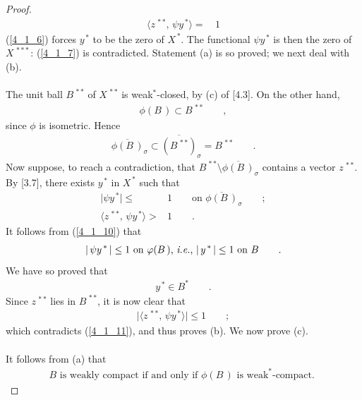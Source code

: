\begin{proof}
\begin{align}
\label{4_1_7} \langle z^{\,\ast\ast},\, \psi y^{\,\ast} \rangle=&\,1
\end{align}
% 
(\ref{4_1_6}) forces $y^{\,\ast}$ to be the zero of $X^{\,\ast}$. The functional $\psi y^{\,\ast}$ is then the zero of
$X^{\,\ast\ast\ast}$: (\ref{4_1_7}) is contradicted. Statement (a) is so proved; we next deal with (b).\\
\\
The unit ball $B^{\,\ast\ast}$ of $X^{\,\ast\ast}$ is weak$^\ast$-closed, by (c) of [4.3]. On the other hand,
% 
\begin{align}
\phi(B\,)\subset  B^{\,\ast\ast}\qquad ,
\end{align}
% 
since $\phi$ is isometric. Hence
% 
\begin{align}
\overline{\phi(B\,)}_\sigma\subset \overline{ (B^{\,\ast\ast})}_\sigma=  B^{\,\ast\ast}\qquad .
\end{align}
% 
Now suppose, to reach a contradiction, that $B^{\,\ast\ast}\setminus \overline{\phi(B\,)}_\sigma$ contains a vector
$z^{\,\ast\ast}$. By [3.7], there exists $y^{\,\ast}$ in $X^{\,\ast}$ such that
% 
\begin{align}
  \label{4_1_10} \lvert \psi y^{\,\ast}  \rvert \leq &1 \qquad  \text{on}\,\,\overline{\phi(B\,)}_\sigma \qquad  ; \\
    \label{4_1_11}  \langle z^{\,\ast\ast},\, \psi y^{\,\ast} \rangle > &1\qquad .
\end{align}
% 
It follows from (\ref{4_1_10}) that 
% 
\begin{align}
\lvert \, \psi y^{\,\ast}\, \rvert \leq 1 \text{  on }\varphi(B\,) \text{, \textit{i.e.}, } \lvert\, y^{\,\ast} \, \rvert \leq 1 \text{  on }
B\qquad .
\end{align}
% 
We have so proved that 
% 
\begin{align}
y^{\,\ast} \in B^\ast \qquad .
\end{align}
% 
Since $ z^{\,\ast\ast}$ lies in $B^{\,\ast\ast}$, it is now clear that 
% 
\begin{align}
\lvert \langle z^{\,\ast\ast},\,  \psi y^{\,\ast} \rangle\rvert \leq 1\qquad; 
\end{align}
% 
which contradicts (\ref{4_1_11}), and thus proves (b). We now prove (c).\\
\\
It follows from (a) that
% 
\begin{align}\label{4_15}
B\text{ is weakly compact if and only if }\phi(B\,) \text{ is weak}^\ast\text{-compact. }
\end{align}

\end{proof}
